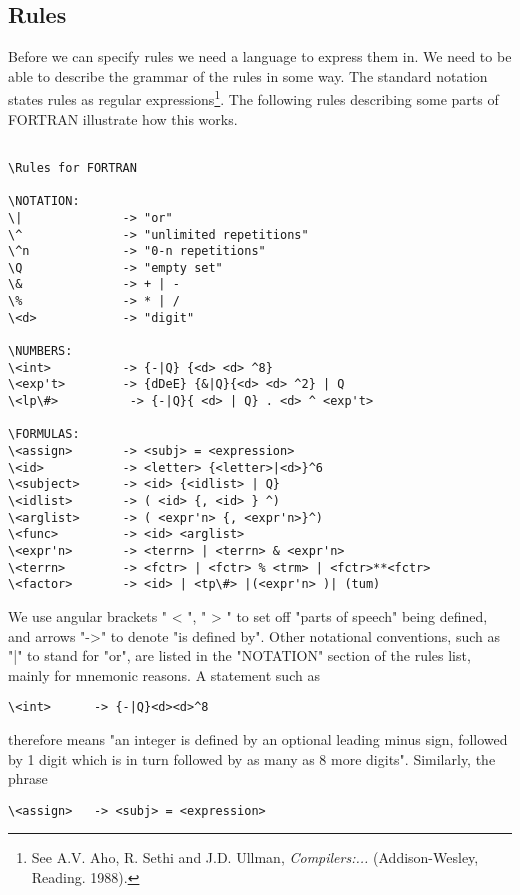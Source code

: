 \subsection{Rules}

Before we can specify rules we need a language to express them in. We need to be able to describe the grammar of the rules in some way. The standard notation states rules as regular expressions\footnote{See A.V. Aho, R. Sethi and J.D. Ullman, \textit{Compilers:...} (Addison-Wesley, Reading. 1988).}. The following rules describing some parts of FORTRAN illustrate how this works.

\begin{verbatim}

\Rules for FORTRAN

\NOTATION:
\|              -> "or"
\^              -> "unlimited repetitions"
\^n             -> "0-n repetitions"
\Q              -> "empty set"
\&              -> + | -
\%              -> * | /
\<d>            -> "digit"

\NUMBERS:
\<int>          -> {-|Q} {<d> <d> ^8}
\<exp't>        -> {dDeE} {&|Q}{<d> <d> ^2} | Q
\<lp\#>          -> {-|Q}{ <d> | Q} . <d> ^ <exp't>

\FORMULAS:
\<assign>       -> <subj> = <expression>
\<id>           -> <letter> {<letter>|<d>}^6
\<subject>      -> <id> {<idlist> | Q}
\<idlist>       -> ( <id> {, <id> } ^)
\<arglist>      -> ( <expr'n> {, <expr'n>}^)
\<func>         -> <id> <arglist>
\<expr'n>       -> <terrn> | <terrn> & <expr'n>
\<terrn>        -> <fctr> | <fctr> % <trm> | <fctr>**<fctr>
\<factor>       -> <id> | <tp\#> |(<expr'n> )| (tum)

\end{verbatim}

We use angular brackets " < ", " > " to set off "parts of speech" being defined, and arrows "->" to denote "is defined by". Other notational conventions, such as "|" to stand for "or", are listed in the "NOTATION" section of the rules list, mainly for mnemonic reasons. A statement such as

\begin{verbatim}
\<int>      -> {-|Q}<d><d>^8
\end{verbatim}

therefore means "an integer is defined by an optional leading minus sign, followed by 1 digit which is in turn followed by as many as 8 more digits". Similarly, the phrase

\begin{verbatim}
\<assign>   -> <subj> = <expression>
\end{verbatim}

